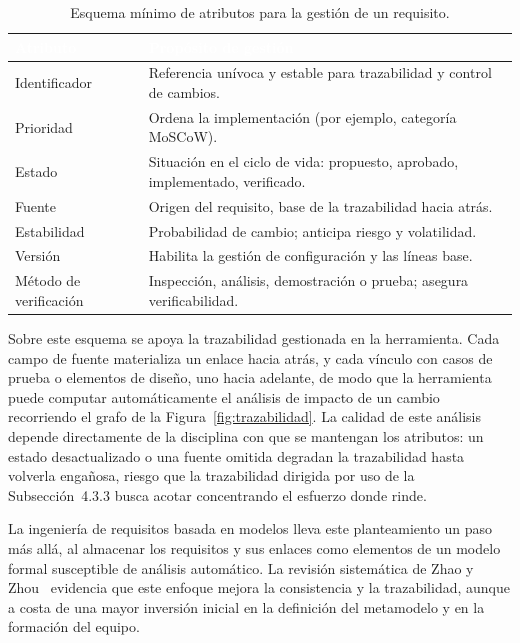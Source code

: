 \documentclass[11pt,a4paper,oneside]{report}
\newcommand{\hd}[1]{\cellcolor{darkblue}\textbf{\textcolor{white}{\small\sffamily #1}}}
\begin{document}
	\begin{table}[htbp]
		\centering
		\caption{Esquema m\'inimo de atributos para la gesti\'on de un requisito.}
		\label{tab:atributos}
		\small\sffamily
		\begin{tabularx}{\linewidth}{@{}L{3.1cm} X@{}}
			\toprule
			\hd{Atributo} & \hd{Prop\'osito de gesti\'on}\\
			\midrule
			Identificador & Referencia un\'ivoca y estable para trazabilidad y control de cambios.\\
			Prioridad & Ordena la implementaci\'on (por ejemplo, categor\'ia MoSCoW).\\
			Estado & Situaci\'on en el ciclo de vida: propuesto, aprobado, implementado, verificado.\\
			Fuente & Origen del requisito, base de la trazabilidad hacia atr\'as.\\
			Estabilidad & Probabilidad de cambio; anticipa riesgo y volatilidad.\\
			Versi\'on & Habilita la gesti\'on de configuraci\'on y las l\'ineas base.\\
			M\'etodo de verificaci\'on & Inspecci\'on, an\'alisis, demostraci\'on o prueba; asegura verificabilidad.\\
			\bottomrule
		\end{tabularx}
	\end{table}
	
	Sobre este esquema se apoya la trazabilidad gestionada en la herramienta. Cada campo de fuente materializa un enlace hacia atr\'as, y cada v\'inculo con casos de prueba o elementos de dise\~no, uno hacia adelante, de modo que la herramienta puede computar autom\'aticamente el an\'alisis de impacto de un cambio recorriendo el grafo de la Figura~\ref{fig:trazabilidad}. La calidad de este an\'alisis depende directamente de la disciplina con que se mantengan los atributos: un estado desactualizado o una fuente omitida degradan la trazabilidad hasta volverla enga\~nosa, riesgo que la trazabilidad dirigida por uso de la Subsecci\'on~4.3.3 busca acotar concentrando el esfuerzo donde rinde.
	
	La ingenier\'ia de requisitos basada en modelos lleva este planteamiento un paso m\'as all\'a, al almacenar los requisitos y sus enlaces como elementos de un modelo formal susceptible de an\'alisis autom\'atico. La revisi\'on sistem\'atica de Zhao y Zhou~\citep{zhao_mbre_2026} evidencia que este enfoque mejora la consistencia y la trazabilidad, aunque a costa de una mayor inversi\'on inicial en la definici\'on del metamodelo y en la formaci\'on del equipo.
	
\end{document}
